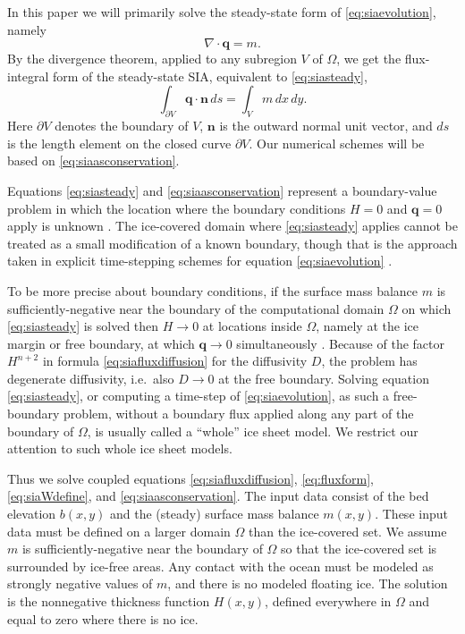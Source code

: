 \documentclass[review,letterpaper]{igs}
\newcommand\bn{\mathbf{n}}
\newcommand\bq{\mathbf{q}}
\newcommand{\Div}{\nabla\cdot}
\begin{document}
In this paper we will primarily solve the steady-state form of \eqref{eq:siaevolution}, namely
\begin{equation}
\Div \bq = m.  \label{eq:siasteady}
\end{equation}
By the divergence theorem, applied to any subregion $V$ of $\Omega$, we get the flux-integral form of the steady-state SIA, equivalent to \eqref{eq:siasteady},
\begin{equation}
  \int_{\partial V} \bq \cdot \bn\,ds = \int_V m\, dx\,dy. \label{eq:siaasconservation}
\end{equation}
Here $\partial V$ denotes the boundary of $V$, $\bn$ is the outward normal unit vector, and $ds$ is the length element on the closed curve $\partial V$.  Our numerical schemes will be based on \eqref{eq:siaasconservation}.

Equations \eqref{eq:siasteady} and \eqref{eq:siaasconservation} represent a boundary-value problem in which the location where the boundary conditions $H=0$ and $\bq=0$ apply is unknown \citep{JouvetBueler2012,JaroschSchoofAnslow2013}.  The ice-covered domain where \eqref{eq:siasteady} applies cannot be treated as a small modification of a known boundary, though that is the approach taken in explicit time-stepping schemes for equation \eqref{eq:siaevolution} \citep{Huybrechtsetal1996,Bueleretal2005}.

To be more precise about boundary conditions, if the surface mass balance $m$ is sufficiently-negative near the boundary of the computational domain $\Omega$ on which \eqref{eq:siasteady} is solved then $H\to 0$ at locations inside $\Omega$, namely at the ice margin or free boundary, at which $\bq \to 0$ simultaneously \citep{JouvetBueler2012}.  Because of the factor $H^{n+2}$ in formula \eqref{eq:siafluxdiffusion} for the diffusivity $D$, the problem has degenerate diffusivity, i.e.~also $D \to 0$ at the free boundary.  Solving equation \eqref{eq:siasteady}, or computing a time-step of \eqref{eq:siaevolution}, as such a free-boundary problem, without a boundary flux applied along any part of the boundary of $\Omega$, is usually called a ``whole'' ice sheet model.  We restrict our attention to such whole ice sheet models.

Thus we solve coupled equations \eqref{eq:siafluxdiffusion}, \eqref{eq:fluxform}, \eqref{eq:siaWdefine}, and \eqref{eq:siaasconservation}.  The input data consist of the bed elevation $b(x,y)$ and the (steady) surface mass balance $m(x,y)$.  These input data must be defined on a larger domain $\Omega$ than the ice-covered set.  We assume $m$ is sufficiently-negative near the boundary of $\Omega$ so that the ice-covered set is surrounded by ice-free areas.  Any contact with the ocean must be modeled as strongly negative values of $m$, and there is no modeled floating ice.  The solution is the nonnegative thickness function $H(x,y)$, defined everywhere in $\Omega$ and equal to zero where there is no ice.
\end{document}
